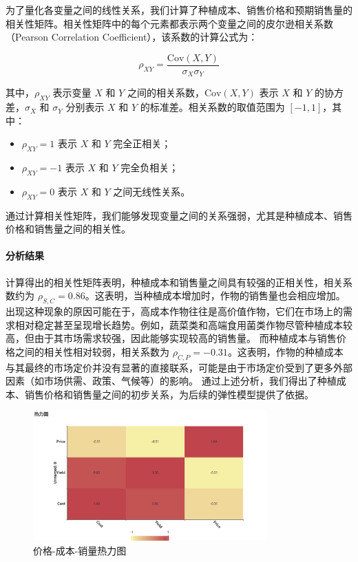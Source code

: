 \documentclass[12pt,a4paper]{nmmcm}
\begin{document}
为了量化各变量之间的线性关系，我们计算了种植成本、销售价格和预期销售量的相关性矩阵。相关性矩阵中的每个元素都表示两个变量之间的皮尔逊相关系数（Pearson Correlation Coefficient），该系数的计算公式为：

\[
  \rho_{XY} = \frac{\mathrm{Cov}(X, Y)}{\sigma_X \sigma_Y}
\]

其中，$\rho_{XY}$ 表示变量 $X$ 和 $Y$ 之间的相关系数，$\mathrm{Cov}(X, Y)$ 表示 $X$ 和 $Y$ 的协方差，$\sigma_X$ 和 $\sigma_Y$ 分别表示 $X$ 和 $Y$ 的标准差。相关系数的取值范围为 $[-1, 1]$，其中：
\begin{itemize}
  \item $\rho_{XY} = 1$ 表示 $X$ 和 $Y$ 完全正相关；
  \item $\rho_{XY} = -1$ 表示 $X$ 和 $Y$ 完全负相关；
  \item $\rho_{XY} = 0$ 表示 $X$ 和 $Y$ 之间无线性关系。
\end{itemize}

通过计算相关性矩阵，我们能够发现变量之间的关系强弱，尤其是种植成本、销售价格和销售量之间的相关性。

\paragraph{分析结果}

计算得出的相关性矩阵表明，种植成本和销售量之间具有较强的正相关性，相关系数约为 $\rho_{S,C} = 0.86$。这表明，当种植成本增加时，作物的销售量也会相应增加。出现这种现象的原因可能在于，高成本作物往往是高价值作物，它们在市场上的需求相对稳定甚至呈现增长趋势。例如，蔬菜类和高端食用菌类作物尽管种植成本较高，但由于其市场需求较强，因此能够实现较高的销售量。
而种植成本与销售价格之间的相关性相对较弱，相关系数为 $\rho_{C,P} = -0.31$。这表明，作物的种植成本与其最终的市场定价并没有显著的直接联系，可能是由于市场定价受到了更多外部因素（如市场供需、政策、气候等）的影响。
通过上述分析，我们得出了种植成本、销售价格和销售量之间的初步关系，为后续的弹性模型提供了依据。

\begin{figure}[H]
  \centering
  \includegraphics[width=0.8\textwidth]{figures/prob3/correlation/价格_成本_销量热力图.png}
  \caption{价格-成本-销量热力图}
  \label{fig:heatmap}
\end{figure}
\end{document}
